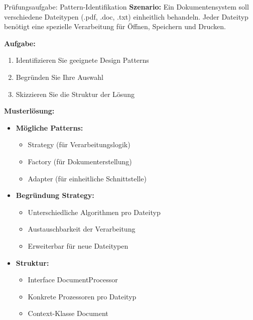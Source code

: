 \begin{example2}{Prüfungsaufgabe: Pattern-Identifikation}
\textbf{Szenario:}
Ein Dokumentensystem soll verschiedene Dateitypen (.pdf, .doc, .txt) einheitlich 
behandeln. Jeder Dateityp benötigt eine spezielle Verarbeitung für Öffnen, 
Speichern und Drucken.

\textbf{Aufgabe:}
\begin{enumerate}
    \item Identifizieren Sie geeignete Design Patterns
    \item Begründen Sie Ihre Auswahl
    \item Skizzieren Sie die Struktur der Lösung
\end{enumerate}

\textbf{Musterlösung:}
\begin{itemize}
    \item \textbf{Mögliche Patterns:}
    \begin{itemize}
        \item Strategy (für Verarbeitungslogik)
        \item Factory (für Dokumenterstellung)
        \item Adapter (für einheitliche Schnittstelle)
    \end{itemize}
    
    \item \textbf{Begründung Strategy:}
    \begin{itemize}
        \item Unterschiedliche Algorithmen pro Dateityp
        \item Austauschbarkeit der Verarbeitung
        \item Erweiterbar für neue Dateitypen
    \end{itemize}
    
    \item \textbf{Struktur:}
    \begin{itemize}
        \item Interface DocumentProcessor
        \item Konkrete Prozessoren pro Dateityp
        \item Context-Klasse Document
    \end{itemize}
\end{itemize}
\end{example2}

